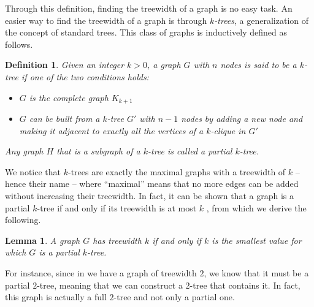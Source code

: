 \documentclass[12pt,a4paper]{article}
\newtheorem{definition}{Definition}
\newtheorem{lemma}{Lemma}
\newcommand{\curlyquotes}[1]{\textquotedblleft #1\textquotedblright}
\begin{document}
	Through this definition, finding the treewidth of a graph is no easy task. An easier way to find the treewidth of a graph is through \textit{$k$-trees}, a generalization of the concept of standard trees. This class of graphs is inductively defined as follows.

	\begin{definition}
		Given an integer $k > 0$, a graph $G$ with $n$ nodes is said to be a $k$-tree if one of the two conditions holds: 
		\begin{itemize}
			\item $G$ is the complete graph $K_{k+1}$
			\item $G$ can be built from a $k$-tree $G'$ with $n-1$ nodes by adding a new node and making it adjacent to exactly all the vertices of a $k$-clique in $G'$
		\end{itemize}

		Any graph $H$ that is a subgraph of a $k$-tree is called a partial $k$-tree. 
	\end{definition}
	
	We notice that $k$-trees are exactly the maximal graphs with a treewidth of $k$ -- hence their name -- where \curlyquotes{maximal} means that no more edges can be added without increasing their treewidth. In fact, it can be shown that a graph is a partial $k$-tree if and only if its treewidth is at most $k$ \cite{k_trees_treewidth}, from which we derive the following.

	\begin{lemma}
		A graph $G$ has treewidth $k$ if and only if $k$ is the smallest value for which $G$ is a partial $k$-tree.
	\end{lemma}

	For instance, since in  we have a graph of treewidth $2$, we know that it must be a partial $2$-tree, meaning that we can construct a $2$-tree that contains it. In fact, this graph is actually a full $2$-tree and not only a partial one.
\end{document}
